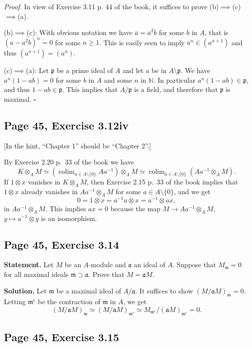 \documentclass[parskip=half,fontsize=12pt]{scrartcl}%
\newcommand{\oo}{\operatorname}\newcommand{\ooo}{\operatorname*}
\newcommand{\mf}{\mathfrak}
\newcommand{\aaa}{\mf a}
\newcommand{\mmm}{\mf m}
\newcommand{\ppp}{\mf p}
\DeclareMathOperator*{\colim}{colim}
\begin{document}
\emph{Proof.} In view of Exercise 3.11 p. 44 of the book, it suffices to prove (b)$\implies$(c)$\implies$(a). 

(b)$\implies$(c): With obvious notation we have $\overline a=\overline a^2\overline b$ for some $b$ in $A$, that is $(a-a^2b)^n=0$ for some $n\ge1$. This is easily seen to imply $a^n\in(a^{n+1})$ and thus $(a^{n+1})=(a^n)$. 

(c)$\implies$(a): Let $\ppp$ be a prime ideal of $A$ and let $a$ be in $A\setminus\ppp$. We have $a^n(1-ab)=0$ for some $b$ in $A$ and some $n$ in $\mathbb N$. In particular $a^n(1-ab)\in\ppp$, and thus $1-ab\in\ppp$. This implies that $A/\ppp$ is a field, and therefore that $\ppp$ is maximal. $\square$

\subsection{Page 45, Exercise 3.12iv}%

[In the hint, ``Chapter 1'' should be ``Chapter 2''.]

By Exercise 2.20 p.~33 of the book we have 
$$
K\otimes_AM\simeq\left(\colim_{a\in A\setminus\{0\}}Aa^{-1}\right)\otimes_AM\simeq\colim_{a\in A\setminus\{0\}}\left(Aa^{-1}\otimes_AM\right).
$$ 
If $1\otimes x$ vanishes in $K\otimes_AM$, then Exercise 2.15 p.~33 of the book implies that $1\otimes x$ already vanishes in $Aa^{-1}\otimes_AM$ for some $a\in A\setminus\{0\}$, and we get 
$$
0=1\otimes x=a^{-1}a\otimes x=a^{-1}\otimes ax,
$$ 
in $Aa^{-1}\otimes_AM$. This implies $ax=0$ because the map $M\to Aa^{-1}\otimes_AM$, $y\mapsto a^{-1}\otimes y$ is an isomorphism. %

\subsection{Page 45, Exercise 3.14}%

\textbf{Statement.} Let $M$ be an $A$-module and $\aaa$ an ideal of $A$. Suppose that $M_\mmm=0$ for all maximal ideals $\mmm\supset\aaa$. Prove that $M=\aaa M$. 

\textbf{Solution.} Let $\mmm$ be a maximal ideal of $A/\aaa$. It suffices to show $(M/\aaa M)_\mmm=0$. Letting $\mmm^{\oo c}$ be the contraction of $\mmm$ in $A$, we get 
$$
(M/\aaa M)_\mmm\simeq(M/\aaa M)_{\mmm^{\oo c}}\simeq M_{\mmm^{\oo c}}/(\aaa M)_{\mmm^{\oo c}}=0.
$$ 

\subsection{Page 45, Exercise 3.15}%
\end{document}
